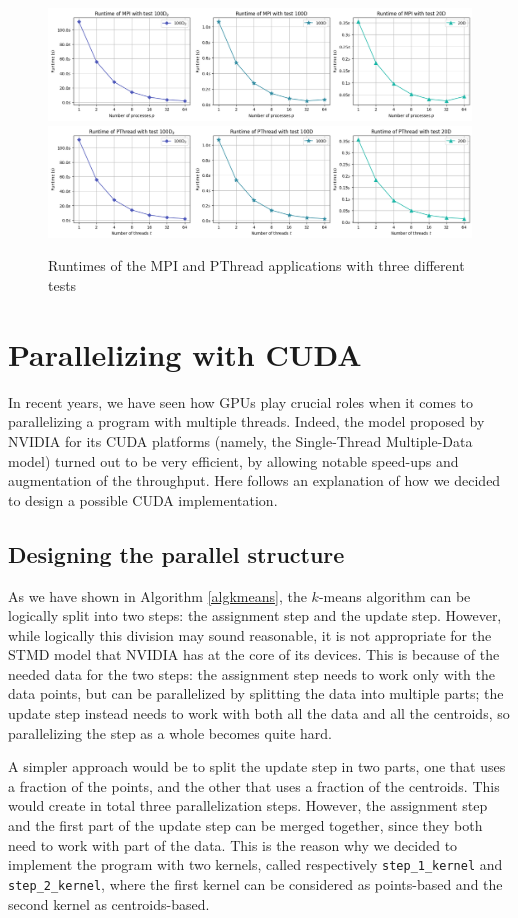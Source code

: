 \documentclass[11pt, journal]{IEEEtran}
\newcommand{\nwl}{

\vspace{11pt}

}
\begin{document}
\begin{figure}
    \label{mpi_pt_runtimes}
    \centering
    \includegraphics[width=\linewidth]{imgs/mpi_runtime.png}
    \includegraphics[width=\linewidth]{imgs/pt_runtime.png}
    \caption{Runtimes of the MPI and PThread applications with three different tests}
\end{figure}

\section{Parallelizing with CUDA}

In recent years, we have seen how GPUs play crucial roles when it comes to parallelizing a program with multiple threads. Indeed, the model proposed by NVIDIA for its CUDA platforms (namely, the Single-Thread Multiple-Data model) turned out to be very efficient, by allowing notable speed-ups and augmentation of the throughput. Here follows an explanation of how we decided to design a possible CUDA implementation.

\subsection{Designing the parallel structure}

As we have shown in Algorithm \ref{algkmeans}, the $k$-means algorithm can be logically split into two steps: the assignment step and the update step. However, while logically this division may sound reasonable, it is not appropriate for the STMD model that NVIDIA has at the core of its devices. This is because of the needed data for the two steps: the assignment step needs to work only with the data points, but can be parallelized by splitting the data into multiple parts; the update step instead needs to work with both all the data and all the centroids, so parallelizing the step as a whole becomes quite hard.
\nwl
A simpler approach would be to split the update step in two parts, one that uses a fraction of the points, and the other that uses a fraction of the centroids. This would create in total three parallelization steps. However, the assignment step and the first part of the update step can be merged together, since they both need to work with part of the data. This is the reason why we decided to implement the program with two kernels, called respectively \verb|step_1_kernel| and \verb|step_2_kernel|, where the first kernel can be considered as points-based and the second kernel as centroids-based.
\end{document}

